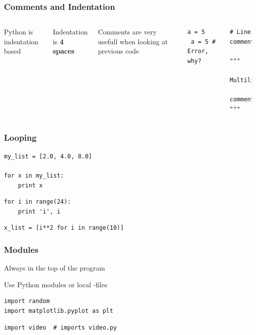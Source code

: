 \documentclass{beamer}
\begin{document}
\begin{frame}[fragile]

    \frametitle{Comments and Indentation}

    \begin{columns}[t]


            Python is indentation based

            Indentation is {\bf 4 spaces}

            \bigskip
            \bigskip

            Comments are very usefull when looking at previous code



\begin{lstlisting}
a = 5
 a = 5 # Error, why?

\end{lstlisting}

\begin{lstlisting}
# Line comment

"""
    Multiline
    comment
"""
\end{lstlisting}

    \end{columns}

\end{frame}




\begin{frame}[fragile]

    \frametitle{Looping}


\begin{lstlisting}
my_list = [2.0, 4.0, 8.0]

for x in my_list:
    print x
\end{lstlisting}


\begin{lstlisting}
for i in range(24):
    print 'i', i
\end{lstlisting}


\begin{lstlisting}
x_list = [i**2 for i in range(10)]
\end{lstlisting}


\end{frame}


\begin{frame}[fragile]

    \frametitle{Modules}

Always in the top of the program

Use Python modules or local -files

\bigskip

\begin{lstlisting}
import random
import matplotlib.pyplot as plt
\end{lstlisting}

\begin{lstlisting}
import video  # imports video.py
\end{lstlisting}


\end{frame}
\end{document}
